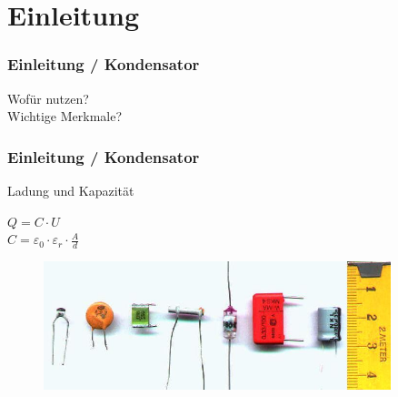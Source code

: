 

\subtitle{Technik Klasse A 03: \\
  Kondensator, Spule, Transformator \\[2em]}
\date{Stand 11.01.2016}


\section*{Einleitung}

\begin{frame}
  \frametitle{Einleitung / Kondensator}
  \begin{center}
    \Large{Wofür nutzen?}\\
    \Large{Wichtige Merkmale?}
  \end{center}
\end{frame}

\begin{frame}
  \frametitle{Einleitung / Kondensator}
  \begin{block}{Ladung und Kapazität}
    \begin{center}
      \Large{$Q = C \cdot U$}\\
      \Large{$C= \varepsilon_{0} \cdot \varepsilon_{r} \cdot \frac{A}{d}$}
    \end{center}
  \end{block}
  \begin{center}
    \begin{figure}
      \includegraphics[width=0.9\textwidth,height=0.5\textheight,keepaspectratio]{e05/Kondensator02.jpg}
    \end{figure}
  \end{center}
\end{frame}


